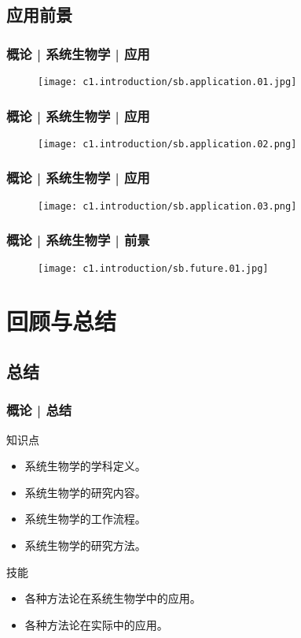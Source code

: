 \subsection{应用前景}
\begin{frame}
  \frametitle{概论 | 系统生物学 | 应用}
  \begin{figure}
    \centering
    \texttt{[image: c1.introduction/sb.application.01.jpg]}
  \end{figure}
\end{frame}

\begin{frame}
  \frametitle{概论 | 系统生物学 | 应用}
  \begin{figure}
    \centering
    \texttt{[image: c1.introduction/sb.application.02.png]}
  \end{figure}
\end{frame}

\begin{frame}
  \frametitle{概论 | 系统生物学 | 应用}
  \begin{figure}
    \centering
    \texttt{[image: c1.introduction/sb.application.03.png]}
  \end{figure}
\end{frame}

\begin{frame}
  \frametitle{概论 | 系统生物学 | 前景}
  \begin{figure}
    \centering
    \texttt{[image: c1.introduction/sb.future.01.jpg]}
  \end{figure}
\end{frame}



\section{回顾与总结}
\subsection{总结}
\begin{frame}
  \frametitle{概论 | 总结}
  \begin{block}{知识点}
    \begin{itemize}
      \item 系统生物学的学科定义。
      \item 系统生物学的研究内容。
      \item 系统生物学的工作流程。
      \item 系统生物学的研究方法。
    \end{itemize}
  \end{block}
  \begin{block}{技能}
    \begin{itemize}
      \item 各种方法论在系统生物学中的应用。
      \item 各种方法论在实际中的应用。
    \end{itemize}
  \end{block}
\end{frame}

